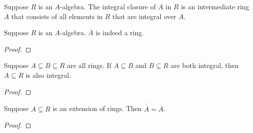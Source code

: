 \begin{definition}
    Suppose \(R\) is an \(A\)-algebra.
    The integral closure of \(A\) in \(R\) is an intermediate ring \(\overline{A}\)
    that consists of all elements in \(R\) that are integral over \(A\).
\end{definition}
\begin{proposition}
    Suppose \(R\) is an \(A\)-algebra.
    \(\overline{A}\) is indeed a ring.
\end{proposition}
\begin{proof}
    
\end{proof}
\begin{lemma}
    Suppose \(A \subseteq B \subseteq R\) are all rings.
    If \(A \subseteq B\) and \(B \subseteq R\) are both integral,
    then \(A \subseteq R\) is also integral.
\end{lemma}
\begin{proof}
    
\end{proof}
\begin{corollary}
    Suppose \(A \subseteq R\) is an extension of rings.
    Then \(\overline{\overline{A}} = \overline{A}\).
\end{corollary}
\begin{proof}
    
\end{proof}

